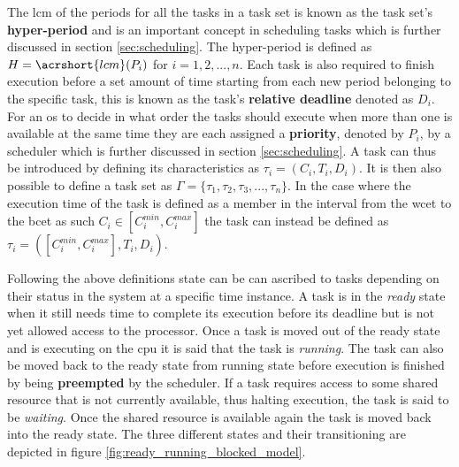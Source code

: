 \documentclass{kththesis}
\begin{document}
The \acrshort{lcm} of the periods for all the tasks in a task set is known as the task set's
\textbf{hyper-period} and is an important concept in scheduling tasks which is further discussed
in section \ref{sec:scheduling}. The hyper-period is defined as $H = \acrshort{lcm}(P_i)$ for $i =
1, 2, ..., n$. Each task is also required to finish execution before a set amount of time starting
from each new period belonging to the specific task, this is known as the task's \textbf{relative
deadline} denoted as $D_i$. For an \acrshort{os} to decide in what order the tasks should execute
when more than one is available at the same time they are each assigned a \textbf{priority}, denoted
by $P_i$, by a scheduler which is further discussed in section \ref{sec:scheduling}. A task can thus
be introduced by defining its characteristics as $\tau_i = (C_i, T_i, D_i)$. It is then also possible to
define a task set as $ \Gamma = \{\tau_1, \tau_2, \tau_3, ..., \tau_n\} $. In the case where the
execution time of the task is defined as a member in the interval from the \acrshort{wcet} to the
\acrshort{bcet} as such $C_i \in [C_i^{min}, C_i^{max}]$ the task can instead be defined as $\tau_i
= ([C_i^{min}, C_i^{max}], T_i, D_i)$.

Following the above definitions state can be can ascribed to tasks depending on their status in the
system at a specific time instance. A task is in the \textit{ready} state when it still needs time
to complete its execution before its deadline but is not yet allowed access to the processor. Once a
task is moved out of the ready state and is executing on the \acrshort{cpu} it is said that the task
is \textit{running}. The task can also be moved back to the ready state from running state before
execution is finished by being \textbf{preempted} by the scheduler. If a task requires access to
some shared resource that is not currently available, thus halting execution, the task is said to be
\textit{waiting}. Once the shared resource is available again the task is moved back into the ready
state. The three different states and their transitioning are depicted in figure
\ref{fig:ready_running_blocked_model}.
\end{document}
